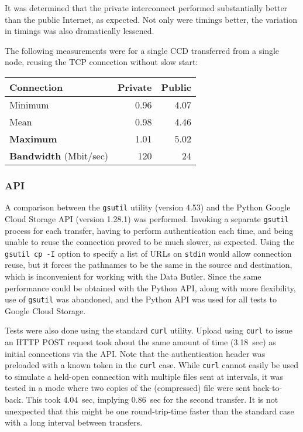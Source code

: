 It was determined that the private interconnect performed substantially better than the public Internet, as expected.
Not only were timings better, the variation in timings was also dramatically lessened.

The following measurements were for a single CCD transferred from a single node, reusing the TCP connection without slow start:

\begin{tabular}{l r r}
Connection & Private & Public \\
\hline
Minimum & 0.96 & 4.07 \\
Mean & 0.98 & 4.46 \\
\textbf{Maximum} & 1.01 & 5.02 \\
\textbf{Bandwidth} (Mbit/sec) & 120 & 24 \\
\end{tabular}

\subsubsection{API}

A comparison between the \texttt{gsutil} utility (version 4.53) and the Python Google Cloud Storage API (version 1.28.1) was performed.
Invoking a separate \texttt{gsutil} process for each transfer, having to perform authentication each time, and being unable to reuse the connection proved to be much slower, as expected.
Using the \texttt{gsutil cp -I} option to specify a list of URLs on \texttt{stdin} would allow connection reuse, but it forces the pathnames to be the same in the source and destination, which is inconvenient for working with the Data Butler.
Since the same performance could be obtained with the Python API, along with more flexibility, use of \texttt{gsutil} was abandoned, and the Python API was used for all tests to Google Cloud Storage.

Tests were also done using the standard \texttt{curl} utility.
Upload using \texttt{curl} to issue an HTTP POST request took about the same amount of time (3.18~sec) as initial connections via the API.
Note that the authentication header was preloaded with a known token in the \texttt{curl} case.
While \texttt{curl} cannot easily be used to simulate a held-open connection with multiple files sent at intervals, it was tested in a mode where two copies of the (compressed) file were sent back-to-back.
This took 4.04~sec, implying 0.86~sec for the second transfer.
It is not unexpected that this might be one round-trip-time faster than the standard case with a long interval between transfers.

